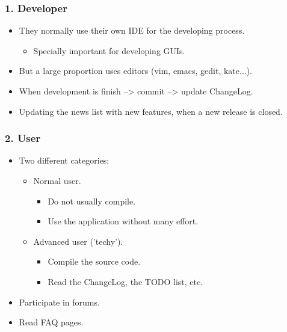 \documentclass{beamer}
\begin{document}

\begin{frame}
 \frametitle{1. Developer}
 \begin{itemize}
  \item They normally use their own IDE for the developing process.
  \begin{itemize}
   \item Specially important for developing GUIs.
  \end{itemize}
  \item But a large proportion uses editors (vim, emacs, gedit, kate...).
  \item When development is finish --> commit --> update ChangeLog.
  \item Updating the news list with new features, when a new release is closed.
 \end{itemize}

\end{frame}


\begin{frame}
 \frametitle{2. User}
 \begin{itemize}
  \item Two different categories:
  \begin{itemize}
   \item Normal user.
   \begin{itemize}
    \item Do not usually compile.
    \item Use the application without many effort.
   \end{itemize}

   \item Advanced user ('techy').
   \begin{itemize}
    \item Compile the source code.
    \item Read the ChangeLog, the TODO list, etc.
   \end{itemize}

  \end{itemize}
  \item Participate in forums.
  \item Read FAQ pages.
 \end{itemize}

\end{frame}
\end{document}

